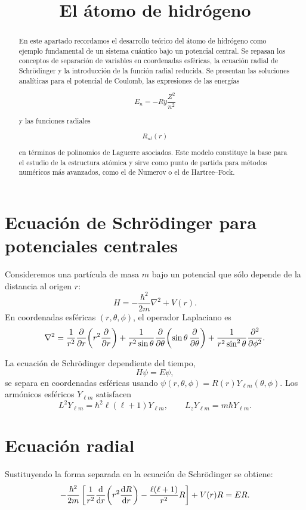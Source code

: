 \documentclass[11pt]{article}
\date{}
\title{El átomo de hidrógeno}
\begin{document}
\maketitle

\begin{abstract}
En este apartado recordamos el desarrollo teórico del átomo de hidrógeno como ejemplo fundamental de un sistema cuántico bajo un potencial central. Se repasan los conceptos de separación de variables en coordenadas esféricas, la ecuación radial de Schrödinger y la introducción de la función radial reducida. Se presentan las soluciones analíticas para el potencial de Coulomb, las expresiones de las energías 

\[ E_n = - Ry \frac{Z^2}{n^2} \]

y las funciones radiales 

\[ R_{nl}(r) \]

en términos de polinomios de Laguerre asociados. Este modelo constituye la base para el estudio de la estructura atómica y sirve como punto de partida para métodos numéricos más avanzados, como el de Numerov o el de Hartree–Fock.
\end{abstract}

\section{Ecuación de Schrödinger para potenciales centrales}
\label{sec:central}

Consideremos una partícula de masa \( m \) bajo un potencial que sólo depende
de la distancia al origen \( r \):
\[
H = -\frac{\hbar^2}{2m}\nabla^2 + V(r).
\]
En coordenadas esféricas \((r,\theta,\phi)\), el operador Laplaciano es
\[
\nabla^2 = \frac{1}{r^2}\pdv{r}\!\left(r^2 \pdv{r}\right)
+ \frac{1}{r^2\sin\theta}\pdv{\theta}\!\left(\sin\theta\,\pdv{\theta}\right)
+ \frac{1}{r^2\sin^2\theta}\pdv[2]{\phi}.
\]

La ecuación de Schrödinger dependiente del tiempo,
\[
H\psi = E\psi,
\]
se separa en coordenadas esféricas usando
\(\psi(r,\theta,\phi)=R(r)Y_{\ell m}(\theta,\phi)\).
Los armónicos esféricos \(Y_{\ell m}\) satisfacen
\[
L^2 Y_{\ell m} = \hbar^2 \ell(\ell+1)Y_{\ell m}, \qquad
L_z Y_{\ell m} = m\hbar Y_{\ell m}.
\]

\section{Ecuación radial}
\label{sec:radial}

Sustituyendo la forma separada en la ecuación de Schrödinger se obtiene:
\begin{equation}
-\frac{\hbar^2}{2m}\left[\frac{1}{r^2}\dv{}{r}\!\left(r^2\dv{R}{r}\right)
-\frac{\ell(\ell+1)}{r^2}R\right] + V(r)R = ER.
\label{eq:radial}
\end{equation}
\end{document}
